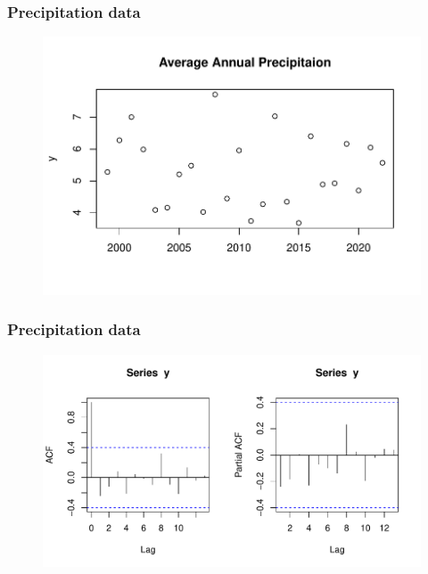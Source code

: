 \documentclass[
	9pt, %
]{beamer}
\begin{document}
\begin{frame}
	\frametitle{Precipitation data}
	\begin{figure}[H] %
	\centering %
	\includegraphics[width=1.0\textwidth]{y_scatter.pdf} %
	\end{figure}
\end{frame}
\begin{frame}
	\frametitle{Precipitation data}	
	\begin{figure}[H] %
	\centering %
	\includegraphics[width=1.0\textwidth]{acf_pacf.pdf} %
	\end{figure}
\end{frame}
\end{document}
